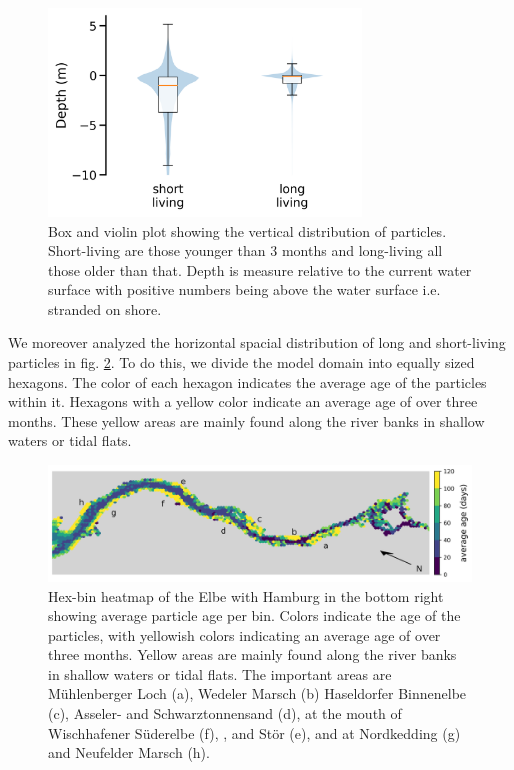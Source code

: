 \documentclass[npg, manuscript]{copernicus}
\begin{document}
\begin{figure}
    \includegraphics[width=8.3cm]{figures/retention_boxplot.png}
    \caption[]{Box and violin plot showing the vertical distribution of particles.  Short-living are those younger than 3 months and long-living all those older than that. Depth is measure relative to the current water surface with positive numbers being above the water surface i.e. stranded on shore.}
    \label{fig:migration-long-vs-short}
\end{figure}

We moreover analyzed the horizontal spacial distribution of long and short-living particles in fig. \ref{fig:migration-long-vs-short-heatmap}.
To do this, we divide the model domain into equally sized hexagons.
The color of each hexagon indicates the average age of the particles within it.
Hexagons with a yellow color indicate an average age of over three months.
These yellow areas are mainly found along the river banks in shallow waters or tidal flats.

\begin{figure}
    \includegraphics[width=12cm]{age_hexbin.png}
    \caption[]{
        Hex-bin heatmap of the Elbe with Hamburg in the bottom right showing average particle age per bin.
        Colors indicate the age of the particles, with yellowish colors indicating an average age of over three months.
        Yellow areas are mainly found along the river banks in shallow waters or tidal flats.
        The important areas are Mühlenberger Loch (a), Wedeler Marsch (b) Haseldorfer Binnenelbe (c), Asseler- and Schwarztonnensand (d), at the mouth of Wischhafener Süderelbe (f), , and Stör (e), and at Nordkedding (g) and Neufelder Marsch (h).
    }
    \label{fig:migration-long-vs-short-heatmap}
\end{figure}
\end{document}
